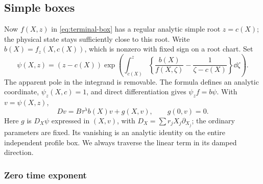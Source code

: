 \subsection{Simple boxes}

Now \(f(X,z)\) in \eqref{eq:terminal-box} has a regular analytic simple
root \(z=c(X)\); the physical state stays sufficiently close to this root.
Write \(b(X)=f_z(X,c(X))\), which is nonzero with fixed sign on a root
chart.  Set
\begin{equation}\label{eq:terminal-linearizer}
 \psi(X,z)=(z-c(X))
 \exp\left(\int_{c(X)}^z
     \left\{\frac{b(X)}{f(X,\zeta)}-
                    \frac1{\zeta-c(X)}\right\}\dd\zeta\right).
\end{equation}
The apparent pole in the integrand is removable.  The formula defines an
analytic coordinate, \(\psi_z(X,c)=1\), and direct differentiation gives
\(\psi_z f=b\psi\).  With \(v=\psi(X,z)\),
\begin{equation}\label{eq:terminal-simple-linearized}
 Dv=B\tau^\lambda b(X)v+g(X,v),\qquad g(0,v)=0.
\end{equation}
Here \(g\) is \(D_X\psi\) expressed in \((X,v)\), with
\(D_X=\sum r_jX_j\partial_{X_j}\); the ordinary parameters are fixed.
Its vanishing is an analytic identity on the entire independent profile
box.  We always traverse the linear term in its damped direction.

\subsubsection{Zero time exponent}

